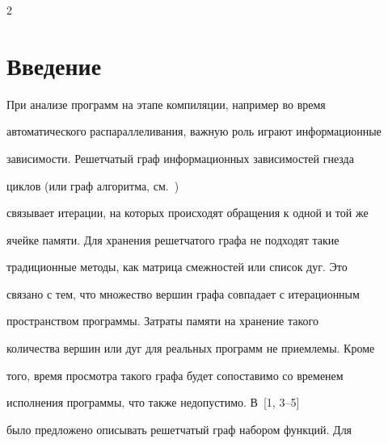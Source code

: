 \vspace*{-1pt}






\vspace*{-3pt}






      \thispagestyle{headings}



      \begin{multicols}{2}



            \label{st\stat}





\section{Введение}



При анализе программ на этапе компиляции, например во время

автоматического распараллеливания, важную роль играют информационные

зависимости. Решетчатый граф информационных зависимостей гнезда

циклов (или граф алгоритма, см.~\cite{Voevodin, ShteinbBYa0})

связывает итерации, на которых происходят обращения к одной и той же

ячейке памяти. Для хранения решетчатого графа не подходят такие

традиционные методы, как матрица смежностей или список дуг. Это

связано с тем, что множество вершин графа совпадает с итерационным

пространством программы. Затраты памяти на хранение такого

количества вершин или дуг для реальных программ не приемлемы. Кроме

того, время просмотра такого графа будет сопоставимо со временем

исполнения программы, что также недопустимо. В~[1, 3--5]

было предложено описывать решетчатый граф набором функций. Для


\end{multicols}
